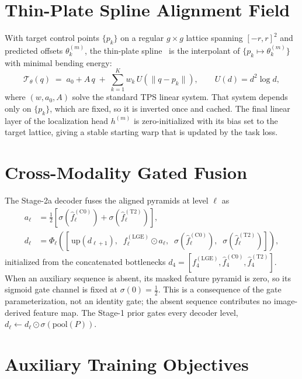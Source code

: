 \documentclass[runningheads]{llncs}
\newcommand{\LGE}{\mathrm{LGE}}
\newcommand{\Cz}{\mathrm{C0}}
\newcommand{\TT}{\mathrm{T2}}
\begin{document}
\section{Thin-Plate Spline Alignment Field}
\label{app:tps}

With target control points $\{p_k\}$ on a regular $g\times g$ lattice spanning
$[-r,r]^2$ and predicted offsets $\theta^{(m)}_k$, the thin-plate
spline~\cite{bookstein1989principal} is the interpolant of
$\{p_k\mapsto\theta^{(m)}_k\}$ with minimal bending energy:
\begin{equation}
\mathcal{T}_{\theta}(q) \;=\; a_0 + A\,q \;+\; \sum_{k=1}^{K} w_k\,U\!\left(\lVert q-p_k\rVert\right),
\qquad U(d)=d^2\log d ,
\end{equation}
where $(w,a_0,A)$ solve the standard TPS linear system. That system depends only
on $\{p_k\}$, which are fixed, so it is inverted once and cached. The final
linear layer of the localization head $h^{(m)}$ is zero-initialized with its bias
set to the target lattice, giving a stable starting warp that is updated by the
task loss.

\section{Cross-Modality Gated Fusion}
\label{app:fusion}

The Stage-2a decoder fuses the aligned pyramids at level $\ell$ as
\begin{align}
a_\ell &= \tfrac{1}{2}\left[\sigma\!\left(\hat{f}^{(\Cz)}_\ell\right) + \sigma\!\left(\hat{f}^{(\TT)}_\ell\right)\right],\\
d_\ell &= \Phi_\ell\!\left(\left[\,\mathrm{up}(d_{\ell+1}),\;\; f^{(\LGE)}_\ell\odot a_\ell,\;\; \sigma\!\left(\hat{f}^{(\Cz)}_\ell\right),\;\; \sigma\!\left(\hat{f}^{(\TT)}_\ell\right)\right]\right),
\end{align}
initialized from the concatenated bottlenecks
$d_4=[f^{(\LGE)}_4,\hat{f}^{(\Cz)}_4,\hat{f}^{(\TT)}_4]$. When an auxiliary
sequence is absent, its masked feature pyramid is zero, so its sigmoid gate
channel is fixed at $\sigma(0)=\tfrac12$. This is a consequence of the gate
parameterization, not an identity gate; the absent sequence contributes no
image-derived feature map. The Stage-1 prior gates every decoder level,
$d_\ell \leftarrow d_\ell\odot\sigma(\mathrm{pool}(P))$.

\section{Auxiliary Training Objectives}
\label{app:losses}
\end{document}
